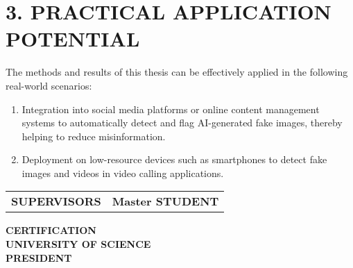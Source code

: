 \section*{3. PRACTICAL APPLICATION POTENTIAL}
The methods and results of this thesis can be effectively applied in the following real-world scenarios:

\begin{enumerate}
	\item Integration into social media platforms or online content management systems to automatically detect and flag AI-generated fake images, thereby helping to reduce misinformation.
	
	\item Deployment on low-resource devices such as smartphones to detect fake images and videos in video calling applications.
\end{enumerate}

\vspace*{3cm}
\begin{center}
	\begin{tabular}{p{} p{}}
		\centering
		{\fontsize{12pt}{16pt}\selectfont \bfseries SUPERVISORS}
		&
		\centering
		{\fontsize{12pt}{16pt}\selectfont \bfseries Master STUDENT}

	\end{tabular}
\end{center}

\vspace*{3cm}

\begin{center}
	{\fontsize{12pt}{16pt}\selectfont \bfseries CERTIFICATION \\ UNIVERSITY OF SCIENCE}\\[0.5cm]
	{\fontsize{12pt}{16pt}\selectfont \bfseries PRESIDENT}
\end{center}


